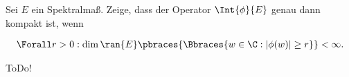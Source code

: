 \begin{exercise}[34/1]

Sei $E$ ein Spektralmaß.
Zeige, dass der Operator $\Int{\phi}{E}$ genau dann kompakt ist, wenn

\begin{align*}
  \Forall r > 0:
  \dim{\ran{E}}
  \pbraces
  {
    \Bbraces
    {
      w \in \C:
      |\phi(w)| \geq r
    }
  }
  < \infty.
\end{align*}

\end{exercise}

\begin{solution}

ToDo!

\end{solution}
